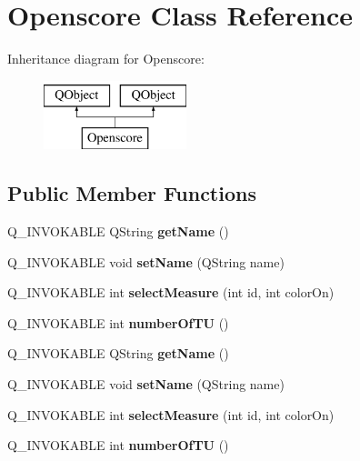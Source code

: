 \hypertarget{class_openscore}{}\section{Openscore Class Reference}
\label{class_openscore}
Inheritance diagram for Openscore\+:\begin{figure}[H]
\begin{center}
\leavevmode
\includegraphics[height=2.000000cm]{class_openscore}
\end{center}
\end{figure}
\subsection*{Public Member Functions}
\begin{DoxyCompactItemize}
\item 
\mbox{\label{class_openscore_a2051131a51bf388b8278358d073a3174}} 
Q\+\_\+\+I\+N\+V\+O\+K\+A\+B\+LE Q\+String {\bfseries get\+Name} ()
\item 
\mbox{\label{class_openscore_adc5aa8f0079ea370615c98474d647d17}} 
Q\+\_\+\+I\+N\+V\+O\+K\+A\+B\+LE void {\bfseries set\+Name} (Q\+String name)
\item 
\mbox{\label{class_openscore_a0655181c7805c7a84acce955868aad23}} 
Q\+\_\+\+I\+N\+V\+O\+K\+A\+B\+LE int {\bfseries select\+Measure} (int id, int color\+On)
\item 
\mbox{\label{class_openscore_a0d9a25557e3a8b4eb1559687b4832a51}} 
Q\+\_\+\+I\+N\+V\+O\+K\+A\+B\+LE int {\bfseries number\+Of\+TU} ()
\item 
\mbox{\label{class_openscore_a2051131a51bf388b8278358d073a3174}} 
Q\+\_\+\+I\+N\+V\+O\+K\+A\+B\+LE Q\+String {\bfseries get\+Name} ()
\item 
\mbox{\label{class_openscore_adc5aa8f0079ea370615c98474d647d17}} 
Q\+\_\+\+I\+N\+V\+O\+K\+A\+B\+LE void {\bfseries set\+Name} (Q\+String name)
\item 
\mbox{\label{class_openscore_a0655181c7805c7a84acce955868aad23}} 
Q\+\_\+\+I\+N\+V\+O\+K\+A\+B\+LE int {\bfseries select\+Measure} (int id, int color\+On)
\item 
\mbox{\label{class_openscore_a0d9a25557e3a8b4eb1559687b4832a51}} 
Q\+\_\+\+I\+N\+V\+O\+K\+A\+B\+LE int {\bfseries number\+Of\+TU} ()
\end{DoxyCompactItemize}



